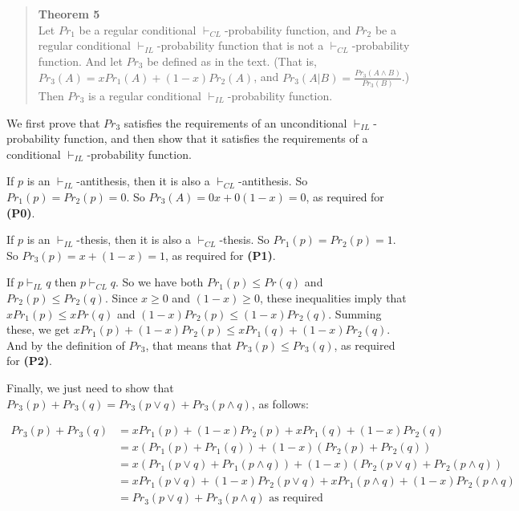 \documentclass[
  11pt,
  letterpaper,
  DIV=11,
  numbers=noendperiod,
  oneside]{scrartcl}
\begin{document}
\begin{quote}
\textbf{Theorem 5}\\
Let \(Pr_1\) be a regular conditional \(\vdash_{CL}\)-probability
function, and \(Pr_2\) be a regular conditional
\(\vdash_{IL}\)-probability function that is not a
\(\vdash_{CL}\)-probability function. And let \(Pr_3\) be defined as in
the text. (That is, \(Pr_3(A) = xPr_1(A) + (1-x)Pr_2(A)\), and
\(Pr_3(A | B) = \frac{Pr_3(A \wedge B)}{Pr_3(B)}\).) Then \(Pr_3\) is a
regular conditional \(\vdash_{IL}\)-probability function.
\end{quote}

We first prove that \(Pr_3\) satisfies the requirements of an
unconditional \(\vdash_{IL}\)-probability function, and then show that
it satisfies the requirements of a conditional
\(\vdash_{IL}\)-probability function.

If \(p\) is an \(\vdash_{IL}\)-antithesis, then it is also a
\(\vdash_{CL}\)-antithesis. So \(Pr_1(p) = Pr_2(p) = 0\). So
\(Pr_3(A) = 0x + 0(1-x) = 0\), as required for \textbf{(P0)}.

If \(p\) is an \(\vdash_{IL}\)-thesis, then it is also a
\(\vdash_{CL}\)-thesis. So \(Pr_1(p) = Pr_2(p) = 1\). So
\(Pr_3(p) = x + (1-x) = 1\), as required for \textbf{(P1)}.

If \(p \vdash_{IL} q\) then \(p \vdash_{CL} q\). So we have both
\(Pr_1(p) \leq Pr(q)\) and \(Pr_2(p) \leq Pr_2(q)\). Since \(x \geq 0\)
and \((1-x) \geq 0\), these inequalities imply that
\(xPr_1(p) \leq xPr(q)\) and \((1-x)Pr_2(p) \leq (1-x)Pr_2(q)\). Summing
these, we get \(xPr_1(p) + (1-x)Pr_2(p) \leq xPr_1(q) + (1-x)Pr_2(q)\).
And by the definition of \(Pr_3\), that means that
\(Pr_3(p) \leq Pr_3(q)\), as required for \textbf{(P2)}.

Finally, we just need to show that
\(Pr_3(p) + Pr_3(q) = Pr_3(p \vee q) + Pr_3(p \wedge q)\), as follows:

\[
\begin{aligned}
Pr_3(p) + Pr_3(q) &= xPr_1(p) + (1-x)Pr_2(p) + xPr_1(q) + (1-x)Pr_2(q) \\
 &= x(Pr_1(p) + Pr_1(q)) + (1-x)(Pr_2(p) + Pr_2(q)) \\
 &= x(Pr_1(p \vee q) + Pr_1(p \wedge q)) + (1-x)(Pr_2(p \vee q) + Pr_2(p \wedge q)) \\
 &= xPr_1(p \vee q) + (1-x)Pr_2(p \vee q) + xPr_1(p \wedge q) + (1-x)Pr_2(p \wedge q) \\
 &= Pr_3(p \vee q) + Pr_3(p \wedge q) \text{ as required}
\end{aligned}
\]
\end{document}
